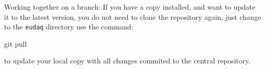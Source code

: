 Working together on a branch:
If you have a copy installed, and want to update it to the
latest version, you do not need to clone the repository again, just change to the \texttt{eudaq} directory use the command:
\begin{listing}[mybash]
git pull
\end{listing}
to update your local copy with all changes commited to the central repository.%

